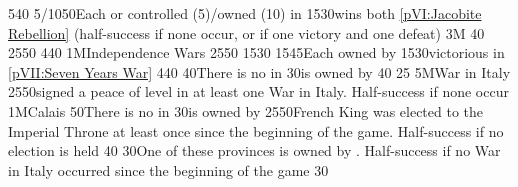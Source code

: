 %
%
{5}{40}{}%
%
%
%
{5/10}{50}{Each \TP or \COL controlled (5)/owned (10) in \continentCaraibes}%
%
%
{15}{30}{\paysmajeurAngleterre wins both \ref{pVI:Jacobite Rebellion} (half-success if none
  occur, or if one victory and one defeat)}%
%
\EUobjective3M{}{}%
{}{40}{}%
%
%
{25}{50}{\EUobjWoSS{\paysmajeurAngleterre}}%
%
%
{4}{40}{\EUobjEastIndiesConvoy{\paysmajeurAngleterre}}%
%
%
\EUobjective1M{Independence Wars}{}%
{25}{50}{\EUobjIndependanceWars}%
%
%
{15}{30}{\EUobjFranceContained}%
%
%
{15}{45}{Each  owned by \paysmajeurAngleterre}%
%
%
{15}{30}{\paysmajeurAngleterre victorious in \ref{pVII:Seven Years War}}%
%
%
{4}{40}{\EUobjEastIndiesConvoy{\paysmajeurAngleterre}}%
%
%
%
 
%
%
{}{40}{There is no \Presidio in \provincePicardie}%
%
%
%
{}{30}{\provinceArtois is owned by \paysmajeurFrance}%
%
%
{}{40}{}%
%
%
{}{25}{}%
%
%
\EUobjective5M{War in Italy}{}%
{25}{50}{\paysmajeurFrance signed a peace of level  in at least one War in
  Italy. Half-success if none occur}%
%
%
\EUobjective1M{Calais}{}%
{}{50}{There is no \Presidio in \provincePicardie}%
%
%
{}{30}{\provinceArtois is owned by \paysmajeurFrance}%
%
%
{25}{50}{French King was elected to the Imperial Throne at least once since
  the beginning of the game. Half-success if no election is held}%
%
%
{}{40}{}%
%
%
{}{30}{One of these provinces is owned by \paysmajeurFrance. Half-success if no War in
  Italy occurred since the beginning of the game}%
%
%
%
{}{30}{}%
%
%
%
